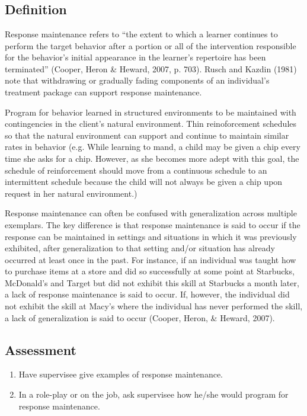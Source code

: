 \section{\fourjTwelve{}}
\subsection{Definition}
Response maintenance refers to ``the extent to which a learner continues to perform the target behavior after a portion or all of the intervention responsible for the behavior's initial appearance in the learner's repertoire has been terminated'' (Cooper, Heron \& Heward, 2007, p. 703). Rusch and Kazdin (1981) note that withdrawing or gradually fading components of an individual's treatment package can support response maintenance. 

Program for behavior learned in structured environments to be maintained with contingencies in the client's natural environment. Thin reinoforcement schedules so that the natural environment can support and continue to maintain similar rates in behavior (e.g. While learning to mand, a child may be given a chip every time she asks for a chip. However, as she becomes more adept with this goal, the schedule of reinforcement should move from a continuous schedule to an intermittent schedule because the child will not always be given a chip upon request in her natural environment.)

Response maintenance can often be confused with generalization across multiple exemplars. The key difference is that response maintenance is said to occur if the response can be maintained in settings and situations in which it was previously exhibited, after generalization to that setting and/or situation has already occurred at least once in the past.  For instance, if an individual was taught how to purchase items at a store and did so successfully at some point at Starbucks, McDonald's and Target but did not exhibit this skill at Starbucks a month later, a lack of response maintenance is said to occur. If, however, the individual did not exhibit the skill at Macy's where the individual has never performed the skill, a lack of generalization is said to occur (Cooper, Heron, \& Heward, 2007). 
%
\subsection{Assessment}
\begin{enumerate}
\item Have supervisee give examples of response maintenance. 
\item In a role-play or on the job, ask supervisee how he/she would program for response maintenance. 
%
\end{enumerate}
%
